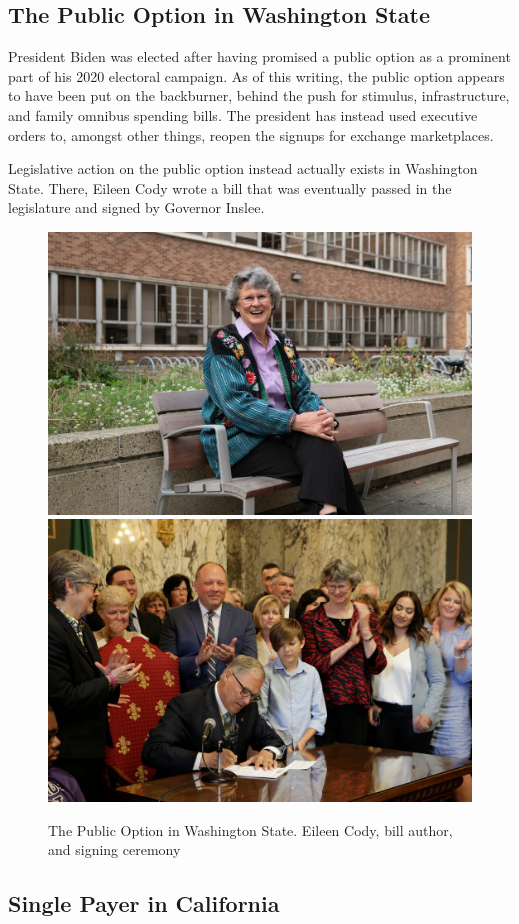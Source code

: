 \documentclass[
  oneside]{book}
\begin{document}
\hypertarget{the-public-option-in-washington-state}{%
\subsection{The Public Option in Washington State}\label{the-public-option-in-washington-state}}

President Biden was elected after having promised a public option as a prominent part of his 2020 electoral campaign. As of this writing, the public option appears to have been put on the backburner, behind the push for stimulus, infrastructure, and family omnibus spending bills. The president has instead used executive orders to, amongst other things, reopen the signups for exchange marketplaces.

Legislative action on the public option instead actually exists in Washington State. There, Eileen Cody wrote a bill that was eventually passed in the legislature and signed by Governor Inslee.

\begin{figure}
\includegraphics[width=0.5\linewidth]{Plots/Web/eileen_cody} \includegraphics[width=0.5\linewidth]{Plots/Web/washington_public_option} \caption{The Public Option in Washington State. Eileen Cody, bill author, and signing ceremony}\label{fig:wastate-publicoption}
\end{figure}

\hypertarget{single-payer-in-california}{%
\subsection{Single Payer in California}\label{single-payer-in-california}}
\end{document}
